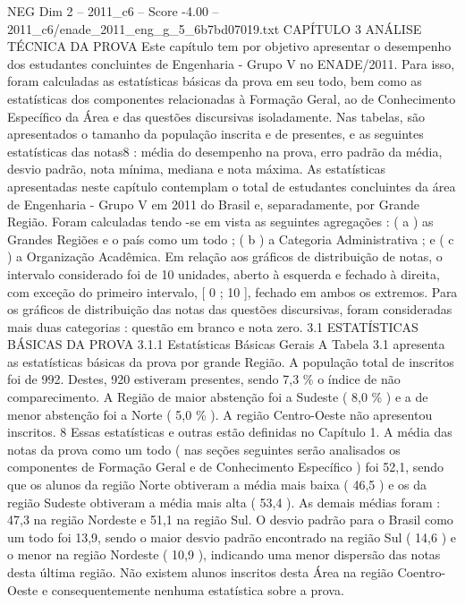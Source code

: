 \begin{textsample}{NEG Dim 2 – 2011\_c6 – Score -4.00 – 2011\_c6/enade\_2011\_eng\_g\_5\_6b7bd07019.txt}  \label{ex:f2_neg_029}
CAPÍTULO 3 ANÁLISE TÉCNICA DA PROVA Este capítulo tem por objetivo apresentar o desempenho dos estudantes concluintes de Engenharia - Grupo V no ENADE/2011.
Para isso, foram calculadas as estatísticas básicas da prova em seu todo, bem como as estatísticas dos componentes relacionadas à Formação Geral, ao de Conhecimento Específico da Área e das questões discursivas isoladamente.
Nas tabelas, são apresentados o tamanho da população inscrita e de presentes, e as seguintes estatísticas das notas8 : média do desempenho na prova, erro padrão da média, desvio padrão, nota mínima, mediana e nota máxima.
As estatísticas apresentadas neste capítulo contemplam o total de estudantes concluintes da área de Engenharia - Grupo V em 2011 do Brasil e, separadamente, por Grande Região.
Foram calculadas tendo -se em vista as seguintes agregações : ( a ) as Grandes Regiões e o país como um todo ; ( b ) a Categoria Administrativa ; e ( c ) a Organização Acadêmica.
Em relação aos gráficos de distribuição de notas, o intervalo considerado foi de 10 unidades, aberto à esquerda e fechado à direita, com exceção do primeiro intervalo, [ 0 ; 10 ], fechado em ambos os extremos.
Para os gráficos de distribuição das notas das questões discursivas, foram consideradas mais duas categorias : questão em branco e nota zero. 3.1 ESTATÍSTICAS BÁSICAS DA PROVA 3.1.1 Estatísticas Básicas Gerais A Tabela 3.1 apresenta as estatísticas básicas da prova por grande Região.
A população total de inscritos foi de 992.
Destes, 920 estiveram presentes, sendo 7,3 \% o índice de não comparecimento.
A Região de maior abstenção foi a Sudeste ( 8,0 \% ) e a de menor abstenção foi a Norte ( 5,0 \% ).
A região Centro-Oeste não apresentou inscritos. 8 Essas estatísticas e outras estão definidas no Capítulo 1.
A média das notas da prova como um todo ( nas seções seguintes serão analisados os componentes de Formação Geral e de Conhecimento Específico ) foi 52,1, sendo que os alunos da região Norte obtiveram a média mais baixa ( 46,5 ) e os da região Sudeste obtiveram a média mais alta ( 53,4 ).
As demais médias foram : 47,3 na região Nordeste e 51,1 na região Sul.
O desvio padrão para o Brasil como um todo foi 13,9, sendo o maior desvio padrão encontrado na região Sul ( 14,6 ) e o menor na região Nordeste ( 10,9 ), indicando uma menor dispersão das notas desta última região.
Não existem alunos inscritos desta Área na região Coentro-Oeste e consequentemente nenhuma estatística sobre a prova.

\end{textsample}

